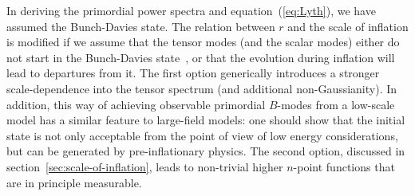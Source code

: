 
In deriving the primordial power spectra and equation~(\ref{eq:Lyth}), we have assumed the Bunch-Davies state. The relation between $r$ and the scale of inflation is modified if we assume that the tensor  modes (and the scalar modes) either do not start in the Bunch-Davies state~\cite{Ashoorioon:2014nta,Collins:2014yua}, or that the evolution during inflation will lead to departures from it. The first option generically introduces a stronger scale-dependence into the tensor spectrum \cite{Aravind:2014axa,Flauger:2013hra} (and additional non-Gaussianity). In addition, this way of achieving observable primordial $B$-modes from a low-scale model has a similar feature to large-field models: one should show that the initial state is not only acceptable from the point of view of low energy considerations, but can be generated by pre-inflationary physics. The second option, discussed in section~\ref{sec:scale-of-inflation}, leads to non-trivial higher $n$-point functions that are in principle measurable.

